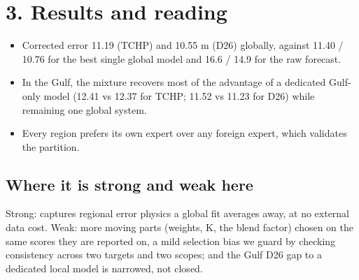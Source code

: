 \documentclass[11pt]{article}
\begin{document}
\section*{3. Results and reading}
\begin{itemize}
\item Corrected error 11.19 (TCHP) and 10.55 m (D26) globally, against 11.40 / 10.76 for the best single global model and 16.6 / 14.9 for the raw forecast.
\item In the Gulf, the mixture recovers most of the advantage of a dedicated Gulf-only model (12.41 vs 12.37 for TCHP; 11.52 vs 11.23 for D26) while remaining one global system.
\item Every region prefers its own expert over any foreign expert, which validates the partition.
\end{itemize}
\subsection*{Where it is strong and weak here}
Strong: captures regional error physics a global fit averages away, at no external data cost. Weak: more moving parts (weights, K, the blend factor) chosen on the same scores they are reported on, a mild selection bias we guard by checking consistency across two targets and two scopes; and the Gulf D26 gap to a dedicated local model is narrowed, not closed.
\end{document}
